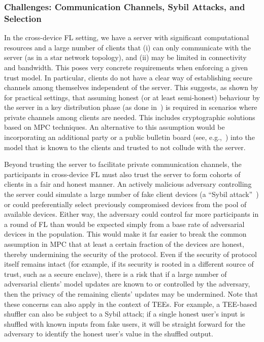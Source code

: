 \subsubsection{Challenges: Communication Channels, Sybil Attacks, and Selection}
\label{sssec:challenges}

In the cross-device FL setting, we have a server with significant computational resources and a large number of clients that (i) can only communicate with the server (as in a star network topology), and (ii) may be limited in connectivity and bandwidth. This poses very concrete requirements when enforcing a given trust model. In particular, clients do not have a clear way of establishing secure channels among themselves independent of the server. This suggests, as shown by \citet{hatelove} for practical settings, that assuming honest (or at least semi-honest) behaviour by the server in a key distribution phase (as done in~\cite{bonawitz17secagg, bell20secagg}) is required in scenarios where private channels among clients are needed. This includes cryptographic solutions based on MPC techniques. An alternative to this assumption would be incorporating an additional party or a public bulletin board (see, e.g.,~\cite{DBLP:conf/sosp/RothNFH19}) into the model that is known to the clients and trusted to not collude with the server. 

Beyond trusting the server to facilitate private communication channels, the participants in cross-device FL must also trust the server to form cohorts of clients in a fair and honest manner.  An actively malicious adversary controlling the server could simulate a large number of fake client devices (a ``Sybil attack''~\cite{sybil-attack}) or could preferentially select previously compromised devices from the pool of available devices.   Either way, the adversary could control far more participants in a round of FL than would be expected simply from a base rate of adversarial devices in the population.  This would make it far easier to break the common assumption in MPC that at least a certain fraction of the devices are honest, thereby undermining the security of the protocol. Even if the security of protocol itself remains intact (for example, if its security is rooted in a different source of trust, such as a secure enclave), there is a risk that if a large number of adversarial clients' model updates are known to or controlled by the adversary, then the privacy of the remaining clients' updates may be undermined.  Note that these concerns can also apply in the context of TEEs.  For example, a TEE-based shuffler can also be subject to a Sybil attack; if a single honest user's input is shuffled with known inputs from fake users, it will be straight forward for the adversary to identify the honest user's value in the shuffled output.

